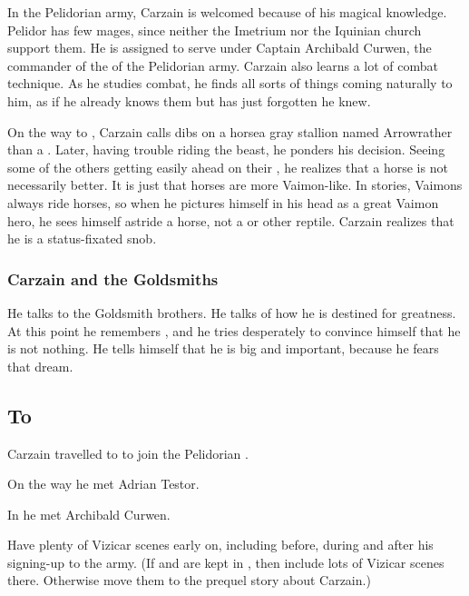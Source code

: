In the Pelidorian army, Carzain is welcomed because of his magical knowledge. Pelidor has few mages, since neither the Imetrium nor the Iquinian church support them. He is assigned to serve under Captain Archibald Curwen, the commander of the \ishrah of the Pelidorian army.  
Carzain also learns a lot of combat technique. As he studies combat, he finds all sorts of things coming naturally to him, as if he already knows them but has just forgotten he knew. 

On the way to \Malcur, Carzain calls dibs on a horse\dash a gray stallion named Arrow\dash rather than a \relc. Later, having trouble riding the beast, he ponders his decision. Seeing some of the others getting easily ahead on their \relcs, he realizes that a horse is not necessarily better. It is just that horses are more Vaimon-like. In stories, Vaimons always ride horses, so when he pictures himself in his head as a great Vaimon hero, he sees himself astride a horse, not a \relc or other reptile. Carzain realizes that he is a status-fixated snob. 





\subsubsection{Carzain and the Goldsmiths}
He talks to the Goldsmith brothers. 
He talks of how he is destined for greatness. 
At this point he remembers , and he tries desperately to convince himself that he is not nothing. 
He tells himself that he is big and important, because he fears that dream. 









\subsection{To \Malcur}
Carzain travelled to \Malcur to join the Pelidorian \ishrah.

On the way he met Adrian Testor. 

In \Malcur he met Archibald Curwen. 

Have plenty of Vizicar scenes early on, including before, during and after his signing-up to the army. 
(If  and  are kept in \TwilightAngelRememberEmph, then include lots of Vizicar scenes there. Otherwise move them to the prequel story about Carzain.)

